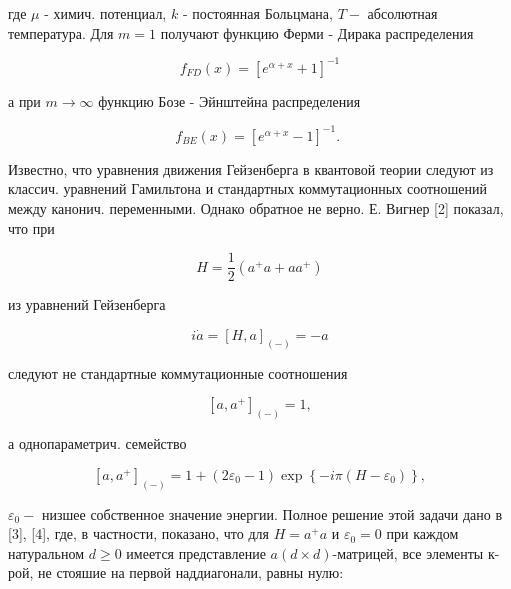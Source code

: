 \documentclass[10pt]{article}
\begin{document}
где $\mu$ - химич. потенциал, $k$ - постоянная Больцмана, $T-$ абсолютная температура. Для $m=1$ получают функцию Ферми - Дирака распределения



\[

f_{F D}(x)=\left[e^{\alpha+x}+1\right]^{-1}

\]



а при $m \rightarrow \infty$ функцию Бозе - Эйнштейна распределения



\[

f_{B E}(x)=\left[e^{\alpha+x}-1\right]^{-1} \text {. }

\]



Известно, что уравнения движения Гейзенберга в квантовой теории следуют из классич. уравнений Гамильтона и стандартных коммутационных соотношений между канонич. переменными. Однако обратное не верно. Е. Вигнер [2] показал, что при



\[

H=\frac{1}{2}\left(a^{+} a+a a^{+}\right)

\]



из уравнений Гейзенберга



\[

i \dot{a}=[H, a]_{(-)}=-a

\]



следуют не стандартные коммутационные соотношения



\[

\left[a, a^{+}\right]_{(-)}=1,

\]



а однопараметрич. семейство



\[

\left[a, a^{+}\right]_{(-)}=1+\left(2 \varepsilon_{0}-1\right) \exp \left\{-i \pi\left(H-\varepsilon_{0}\right)\right\},

\]



$\varepsilon_{0}-$ низшее собственное значение энергии. Полное решение этой задачи дано в [3], [4], где, в частности, показано, что для $H=a^{+} a$ и $\varepsilon_{0}=0$ при каждом натуральном $d \geqslant 0$ имеется представление $a(d \times d)$-матрицей, все элементы к-рой, не стояшие на первой наддиагонали, равны нулю:
\end{document}
